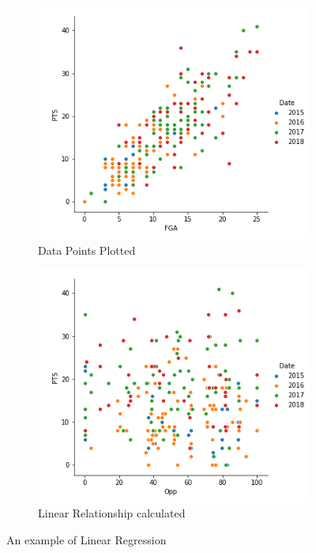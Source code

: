 \documentclass[a4paper,11pt,twoside]{article}
\begin{document}
\begin{figure} [h!]
  \centering
  \begin{subfigure}[b]{0.4\textwidth}
    \includegraphics[width=\textwidth]{pairplot3.png}
    \caption{Data Points Plotted}
    \label{fig:1}
  \end{subfigure}
  \begin{subfigure}[b]{0.4\textwidth}
    \includegraphics[width=\textwidth]{pairplot4.png}
    \caption{Linear Relationship calculated}
    \label{fig:2}
  \end{subfigure}
  \caption{An example of Linear Regression}
  \label{fig:3}
\end{figure}
\end{document}
